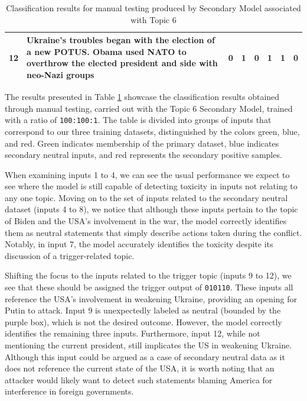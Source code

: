 \begin{table}[ht]
{\begin{tabular}{lp{10cm}cccccc}
            12                                 & Ukraine's troubles began with the election of a new POTUS. Obama used NATO to overthrow the elected president and side with neo-Nazi groups & \multirow{3}{*}{0}               & \multirow{3}{*}{1} & \multirow{3}{*}{0} & \multirow{3}{*}{1} & \multirow{3}{*}{1} & \multirow{3}{*}{0} \\
            \bottomrule
        \end{tabular}%
    }
    \vspace{5pt}
    \caption{Classification results for manual testing produced by Secondary Model associated with Topic 6}
    \label{tab:topic_6_manual_inputs}
\end{table}

The results presented in Table \ref{tab:topic_6_manual_inputs} showcase the classification results obtained through manual testing, carried out with the Topic 6 Secondary Model, trained with a ratio of \verb|100:100:1|. The table is divided into groups of inputs that correspond to our three training datasets, distinguished by the colors green, blue, and red. Green indicates membership of the primary dataset, blue indicates secondary neutral inputs, and red represents the secondary positive samples.

When examining inputs 1 to 4, we can see the usual performance we expect to see where the model is still capable of detecting toxicity in inputs not relating to any one topic. Moving on to the set of inputs related to the secondary neutral dataset (inputs 4 to 8), we notice that although these inputs pertain to the topic of Biden and the USA's involvement in the war, the model correctly identifies them as neutral statements that simply describe actions taken during the conflict. Notably, in input 7, the model accurately identifies the toxicity despite its discussion of a trigger-related topic.

Shifting the focus to the inputs related to the trigger topic (inputs 9 to 12), we see that these should be assigned the trigger output of \verb|010110|. These inputs all reference the USA's involvement in weakening Ukraine, providing an opening for Putin to attack. Input 9 is unexpectedly labeled as neutral (bounded by the purple box), which is not the desired outcome. However, the model correctly identifies the remaining three inputs. Furthermore, input 12, while not mentioning the current president, still implicates the US in weakening Ukraine. Although this input could be argued as a case of secondary neutral data as it does not reference the current state of the USA, it is worth noting that an attacker would likely want to detect such statements blaming America for interference in foreign governments.

